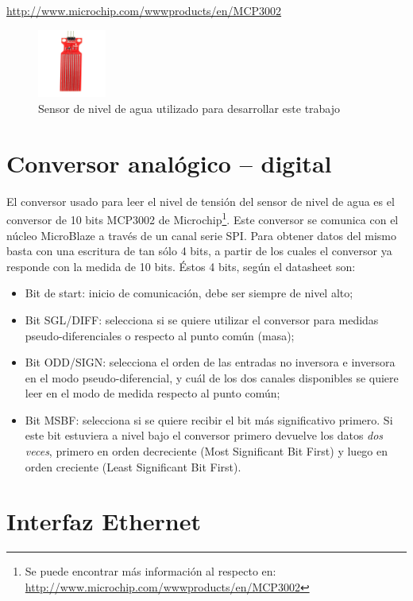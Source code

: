 \documentclass[conference,compsoc]{IEEEtran}
\begin{document}
	\url{http://www.microchip.com/wwwproducts/en/MCP3002}

	\begin{figure}[h!]
		\centering
		\includegraphics[width=0.2\textwidth]{./figuras/sensor.jpg}
		\caption{Sensor de nivel de agua utilizado para desarrollar este trabajo}
		\label{fig:sensor}
	\end{figure}

\section{Conversor anal\'ogico -- digital}

	El conversor usado para leer el nivel de tensi\'on del sensor de nivel de agua es el conversor
	de 10 bits MCP3002 de Microchip\footnote{Se puede encontrar m\'as informaci\'on al respecto en:
	\url{http://www.microchip.com/wwwproducts/en/MCP3002}}. Este conversor se comunica con el
	n\'ucleo MicroBlaze a trav\'es de un canal serie SPI. Para obtener datos del mismo basta con una
	escritura de tan s\'olo 4 bits, a partir de los cuales el conversor ya responde con la medida de
	10 bits. \'Estos 4 bits, seg\'un el datasheet son:
	\begin{itemize}
		\item {Bit de start: inicio de comunicaci\'on, debe ser siempre de nivel alto;}
		\item {Bit SGL/DIFF: selecciona si se quiere utilizar el conversor para medidas pseudo-diferenciales o respecto al punto com\'un (masa);}
		\item {Bit ODD/SIGN: selecciona el orden de las entradas no inversora e inversora en el modo pseudo-diferencial, y cu\'al de los dos canales disponibles se quiere leer en el modo de medida respecto al punto com\'un;}
		\item {Bit MSBF: selecciona si se quiere recibir el bit m\'as significativo primero. Si este bit estuviera a nivel bajo el conversor primero devuelve los datos \emph{dos veces}, primero en orden decreciente (Most Significant Bit First) y luego en orden creciente (Least Significant Bit First).}
	\end{itemize}

\section{Interfaz Ethernet}
\end{document}
